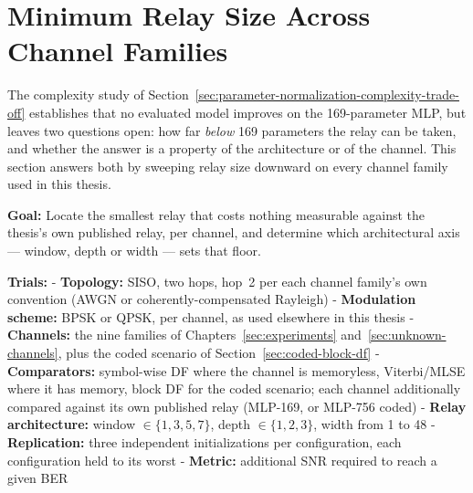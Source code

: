 \section{Minimum Relay Size Across Channel Families}\label{sec:minimum-relay-size}

The complexity study of Section~\ref{sec:parameter-normalization-complexity-trade-off} establishes that no evaluated model improves on the 169-parameter MLP, but leaves two questions open: how far \emph{below} 169 parameters the relay can be taken, and whether the answer is a property of the architecture or of the channel. This section answers both by sweeping relay size downward on every channel family used in this thesis.

\textbf{Goal:} Locate the smallest relay that costs nothing measurable against the thesis's own published relay, per channel, and determine which architectural axis --- window, depth or width --- sets that floor.

\textbf{Trials:} - \textbf{Topology:} SISO, two hops, hop~2 per each channel family's own convention (AWGN or coherently-compensated Rayleigh) - \textbf{Modulation scheme:} BPSK or QPSK, per channel, as used elsewhere in this thesis - \textbf{Channels:} the nine families of Chapters~\ref{sec:experiments} and~\ref{sec:unknown-channels}, plus the coded scenario of Section~\ref{sec:coded-block-df} - \textbf{Comparators:} symbol-wise DF where the channel is memoryless, Viterbi/MLSE where it has memory, block DF for the coded scenario; each channel additionally compared against its own published relay (MLP-169, or MLP-756 coded) - \textbf{Relay architecture:} window $\in\{1,3,5,7\}$, depth $\in\{1,2,3\}$, width from 1 to 48 - \textbf{Replication:} three independent initializations per configuration, each configuration held to its worst - \textbf{Metric:} additional SNR required to reach a given BER

